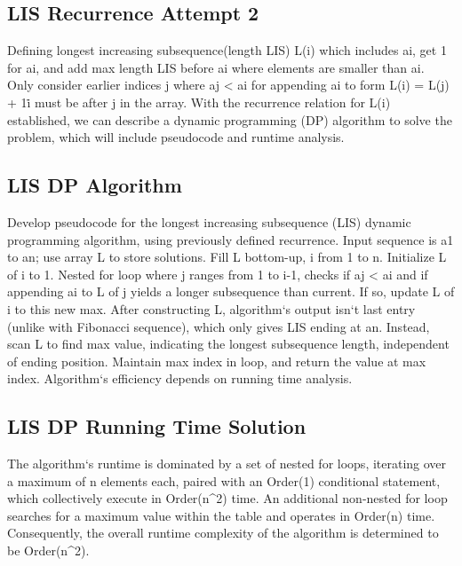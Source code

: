 \subsection*{LIS  Recurrence Attempt 2}
Defining longest increasing subsequence(length LIS) L(i) which includes ai, get 1 for ai, and add max length LIS before ai where elements are smaller than ai.
Only consider earlier indices j where aj \textless{} ai for appending ai to form L(i) = L(j) + 1\. i must be after j in the array.
With the recurrence relation for L(i) established, we can describe a dynamic programming (DP) algorithm to solve the problem, which will include pseudocode and runtime analysis.

\subsection*{LIS  DP Algorithm}
Develop pseudocode for the longest increasing subsequence (LIS) dynamic programming algorithm, using previously defined recurrence.
Input sequence is a1 to an; use array L to store solutions.
Fill L bottom-up, i from 1 to n.
Initialize L of i to 1.
Nested for loop where j ranges from 1 to i-1, checks if aj \textless{} ai and if appending ai to L of j yields a longer subsequence than current.
If so, update L of i to this new max.
After constructing L, algorithm`s output isn`t last entry (unlike with Fibonacci sequence), which only gives LIS ending at an.
Instead, scan L to find max value, indicating the longest subsequence length, independent of ending position.
Maintain max index in loop, and return the value at max index.
Algorithm`s efficiency depends on running time analysis.

\subsection*{LIS  DP Running Time Solution}
The algorithm`s runtime is dominated by a set of nested for loops, iterating over a maximum of n elements each, paired with an Order(1) conditional statement, which collectively execute in Order(n\textasciicircum{}2) time.
An additional non-nested for loop searches for a maximum value within the table and operates in Order(n) time.
Consequently, the overall runtime complexity of the algorithm is determined to be Order(n\textasciicircum{}2).

